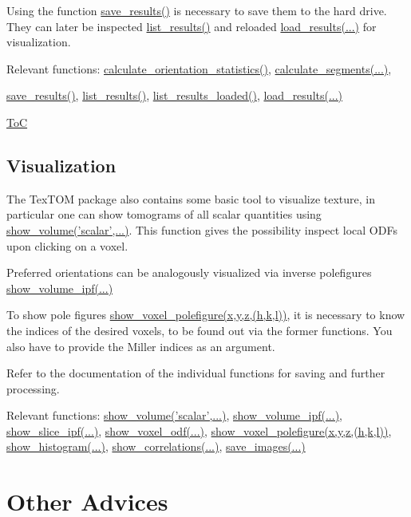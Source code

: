 Using the function \hyperref[fun:saveresults]{save\_results()} is necessary to save them to the hard drive.
They can later be inspected \hyperref[fun:listresults]{list\_results()} and reloaded \hyperref[fun:loadresults]{load\_results(...)}
for visualization.

Relevant functions:
\hyperref[fun:calculateorientationstatistics]{calculate\_orientation\_statistics()},
\hyperref[fun:calculatesegments]{calculate\_segments(...)},

\hyperref[fun:saveresults]{save\_results()},
\hyperref[fun:listresults]{list\_results()},
\hyperref[fun:listresultsloaded]{list\_results\_loaded()},
\hyperref[fun:loadresults]{load\_results(...)}

\begin{flushright}
    \hyperref[toc]{ToC}
\end{flushright}

\subsection{Visualization}
The TexTOM package also contains some basic tool to visualize texture, in particular
one can show tomograms of all scalar quantities using \hyperref[fun:showvolume]{show\_volume('scalar',...)}.
This function gives the possibility inspect local ODFs upon clicking on a voxel.

Preferred orientations can be analogously visualized via inverse polefigures \hyperref[fun:showvolume]{show\_volume\_ipf(...)}

To show pole figures \hyperref[fun:showvoxelpolefigure]{show\_voxel\_polefigure(x,y,z,(h,k,l))}, it is necessary to know 
the indices of the desired voxels, to be found out via the former functions. You also have to provide the
Miller indices as an argument.

Refer to the documentation of the individual functions for saving and further processing.

Relevant functions:
\hyperref[fun:showvolume]{show\_volume('scalar',...)},
\hyperref[fun:showvolumeipf]{show\_volume\_ipf(...)},
\hyperref[fun:showsliceipf]{show\_slice\_ipf(...)},
\hyperref[fun:showvoxelodf]{show\_voxel\_odf(...)},
\hyperref[fun:showvoxelpolefigure]{show\_voxel\_polefigure(x,y,z,(h,k,l))},
\hyperref[fun:showhistogram]{show\_histogram(...)},
\hyperref[fun:showcorrelations]{show\_correlations(...)},
\hyperref[fun:saveimages]{save\_images(...)}

\section{Other Advices}
